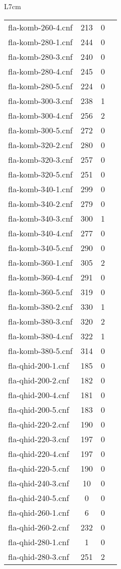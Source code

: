\begin{wraptable}{L}{7cm}
\begin{tabular}{l| c c c }
fla-komb-260-4.cnf & 213 & 0 \\
fla-komb-280-1.cnf & 244 & 0 \\
fla-komb-280-3.cnf & 240 & 0 \\
fla-komb-280-4.cnf & 245 & 0 \\
fla-komb-280-5.cnf & 224 & 0 \\
fla-komb-300-3.cnf & 238 & 1 \\
fla-komb-300-4.cnf & 256 & 2 \\
fla-komb-300-5.cnf & 272 & 0 \\
fla-komb-320-2.cnf & 280 & 0 \\
fla-komb-320-3.cnf & 257 & 0 \\
fla-komb-320-5.cnf & 251 & 0 \\
fla-komb-340-1.cnf & 299 & 0 \\
fla-komb-340-2.cnf & 279 & 0 \\
fla-komb-340-3.cnf & 300 & 1 \\
fla-komb-340-4.cnf & 277 & 0 \\
fla-komb-340-5.cnf & 290 & 0 \\
fla-komb-360-1.cnf & 305 & 2 \\
fla-komb-360-4.cnf & 291 & 0 \\
fla-komb-360-5.cnf & 319 & 0 \\
fla-komb-380-2.cnf & 330 & 1 \\
fla-komb-380-3.cnf & 320 & 2 \\
fla-komb-380-4.cnf & 322 & 1 \\
fla-komb-380-5.cnf & 314 & 0 \\
fla-qhid-200-1.cnf & 185 & 0 \\
fla-qhid-200-2.cnf & 182 & 0 \\
fla-qhid-200-4.cnf & 181 & 0 \\
fla-qhid-200-5.cnf & 183 & 0 \\
fla-qhid-220-2.cnf & 190 & 0 \\
fla-qhid-220-3.cnf & 197 & 0 \\
fla-qhid-220-4.cnf & 197 & 0 \\
fla-qhid-220-5.cnf & 190 & 0 \\
fla-qhid-240-3.cnf & 10 & 0 \\
fla-qhid-240-5.cnf & 0 & 0 \\
fla-qhid-260-1.cnf & 6 & 0 \\
fla-qhid-260-2.cnf & 232 & 0 \\
fla-qhid-280-1.cnf & 1 & 0 \\
fla-qhid-280-3.cnf & 251 & 2 \\

\end{tabular}
\end{wraptable}
